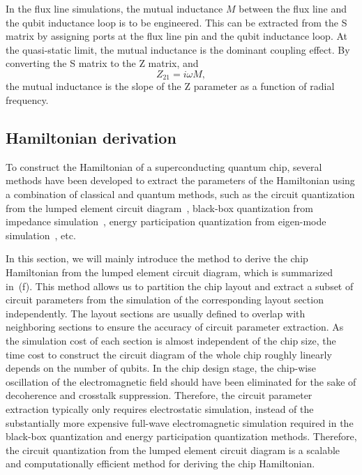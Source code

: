 \documentclass[a4paper,onecolumn,11pt,unpublished]{quantumarticle}
\begin{document}
In the flux line simulations, the mutual inductance $M$ between the flux line and the qubit inductance loop is to be engineered. This can be extracted from the S matrix by assigning ports at the flux line pin and the qubit inductance loop. At the quasi-static limit, the mutual inductance is the dominant coupling effect. By converting the S matrix to the Z matrix, and 
\begin{equation}
    Z_{21} = i \omega M,
\end{equation}
the mutual inductance is the slope of the Z parameter as a function of radial frequency.  


\subsection{Hamiltonian derivation}
\label{sec:hamiltonian_derivation}

To construct the Hamiltonian of a superconducting quantum chip, several methods have been developed to extract the parameters of the Hamiltonian using a combination of classical and quantum methods, such as the circuit quantization from the lumped element circuit diagram~\cite{Burkard2004Multilevel, Burkard2005Circuit,Vool2017Introduction}, black-box quantization from impedance simulation~\cite{Nigg2012BlackBox}, energy participation quantization from eigen-mode simulation~\cite{Minev2021Energyparticipation, Yilmaz2024Energy}, etc. 

In this section, we will mainly introduce the method to derive the chip Hamiltonian from the lumped element circuit diagram, which is summarized in~(f). 
This method allows us to partition the chip layout and extract a subset of circuit parameters from the simulation of the corresponding layout section independently. The layout sections are usually defined to overlap with neighboring sections to ensure the accuracy of circuit parameter extraction. As the simulation cost of each section is almost independent of the chip size, the time cost to construct the circuit diagram of the whole chip roughly linearly depends on the number of qubits. 
In the chip design stage, the chip-wise oscillation of the electromagnetic field should have been eliminated for the sake of decoherence and crosstalk suppression. Therefore, the circuit parameter extraction typically only requires electrostatic simulation, instead of the substantially more expensive full-wave electromagnetic simulation required in the black-box quantization and energy participation quantization methods. 
Therefore, the circuit quantization from the lumped element circuit diagram is a scalable and computationally efficient method for deriving the chip Hamiltonian. 
\end{document}
